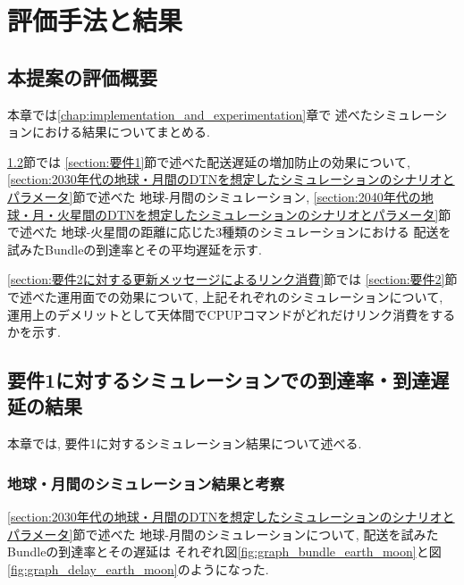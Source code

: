 \chapter{評価手法と結果}
\label{chap:evaluation}
\section{本提案の評価概要}
本章では\ref{chap:implementation_and_experimentation}章で
述べたシミュレーションにおける結果についてまとめる.

\ref{section:要件1に対するシミュレーション結果}節では
\ref{section:要件1}節で述べた配送遅延の増加防止の効果について, 
\ref{section:2030年代の地球・月間のDTNを想定したシミュレーションのシナリオとパラメータ}節で述べた
地球-月間のシミュレーション, 
\ref{section:2040年代の地球・月・火星間のDTNを想定したシミュレーションのシナリオとパラメータ}節で述べた
地球-火星間の距離に応じた3種類のシミュレーションにおける
配送を試みたBundleの到達率とその平均遅延を示す. 

\ref{section:要件2に対する更新メッセージによるリンク消費}節では
\ref{section:要件2}節で述べた運用面での効果について, 
上記それぞれのシミュレーションについて, 
運用上のデメリットとして天体間でCPUPコマンドがどれだけリンク消費をするかを示す. 

\section{要件1に対するシミュレーションでの到達率・到達遅延の結果}
\label{section:要件1に対するシミュレーション結果}
本章では, 要件1に対するシミュレーション結果について述べる. 

\subsection{地球・月間のシミュレーション結果と考察}
\label{section:地球・月間のシミュレーション結果と考察}
\ref{section:2030年代の地球・月間のDTNを想定したシミュレーションのシナリオとパラメータ}節で述べた
地球-月間のシミュレーションについて, 配送を試みたBundleの到達率とその遅延は
それぞれ図\ref{fig:graph_bundle_earth_moon}と図\ref{fig:graph_delay_earth_moon}のようになった. 

